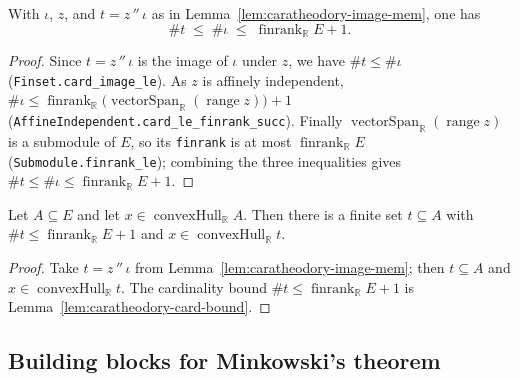 \begin{lemma}
    \label{lem:caratheodory-card-bound}
    \leanok
    With $\iota$, $z$, and $t = z\,''\,\iota$ as in
    Lemma~\ref{lem:caratheodory-image-mem}, one has
    \[
        \#t \;\le\; \#\iota \;\le\; \operatorname{finrank}_{\mathbb R} E + 1 .
    \]
\end{lemma}
\begin{proof}
    Since $t = z\,''\,\iota$ is the image of $\iota$ under $z$, we have
    $\#t \le \#\iota$ (\texttt{Finset.card\_image\_le}). As $z$ is affinely
    independent,
    $\#\iota \le \operatorname{finrank}_{\mathbb R}\big(\operatorname{vectorSpan}_{\mathbb R}(\operatorname{range} z)\big) + 1$
    (\texttt{AffineIndependent.card\_le\_finrank\_succ}). Finally
    $\operatorname{vectorSpan}_{\mathbb R}(\operatorname{range} z)$ is a submodule of
    $E$, so its \texttt{finrank} is at most $\operatorname{finrank}_{\mathbb R} E$
    (\texttt{Submodule.finrank\_le}); combining the three inequalities gives
    $\#t \le \#\iota \le \operatorname{finrank}_{\mathbb R} E + 1$.
\end{proof}

\begin{lemma}
    \label{lem:caratheodory-card}
    \leanok
    Let $A \subseteq E$ and let $x \in \operatorname{convexHull}_{\mathbb R} A$.
    Then there is a finite set $t \subseteq A$ with
    $\#t \le \operatorname{finrank}_{\mathbb R} E + 1$ and
    $x \in \operatorname{convexHull}_{\mathbb R} t$.
\end{lemma}
\begin{proof}
    Take $t = z\,''\,\iota$ from Lemma~\ref{lem:caratheodory-image-mem}; then
    $t \subseteq A$ and $x \in \operatorname{convexHull}_{\mathbb R} t$. The
    cardinality bound $\#t \le \operatorname{finrank}_{\mathbb R} E + 1$ is
    Lemma~\ref{lem:caratheodory-card-bound}.
\end{proof}

\subsection{Building blocks for Minkowski's theorem}

